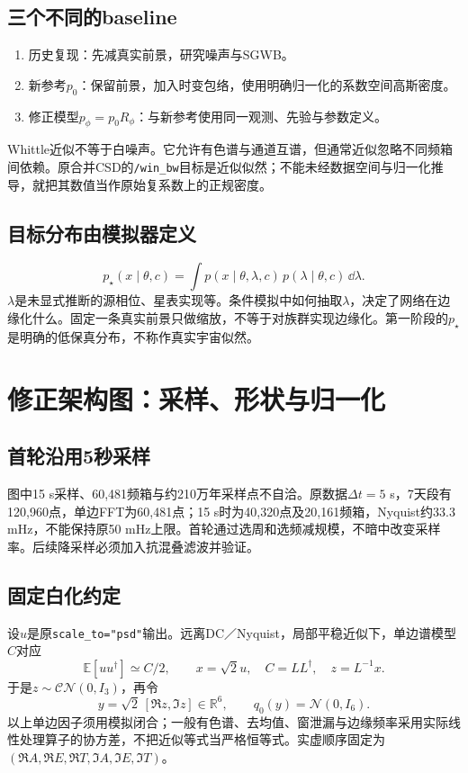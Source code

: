 \documentclass[UTF8,fontset=none,a4paper,11pt]{ctexart}
\newcommand{\code}[1]{\texttt{\nolinkurl{#1}}}
\begin{document}
\subsection{三个不同的baseline}
\begin{enumerate}
\item 历史复现：先减真实前景，研究噪声与SGWB。
\item 新参考$p_0$：保留前景，加入时变包络，使用明确归一化的系数空间高斯密度。
\item 修正模型$p_\phi=p_0R_\phi$：与新参考使用同一观测、先验与参数定义。
\end{enumerate}
Whittle近似不等于白噪声。它允许有色谱与通道互谱，但通常近似忽略不同频箱间依赖。原合并CSD的\code{/win_bw}目标是近似似然；不能未经数据空间与归一化推导，就把其数值当作原始复系数上的正规密度。
\subsection{目标分布由模拟器定义}
\[
p_\star(x\mid\theta,c)=\int p(x\mid\theta,\lambda,c)\,
 p(\lambda\mid\theta,c)\,\dd\lambda.
\]
$\lambda$是未显式推断的源相位、星表实现等。条件模拟中如何抽取$\lambda$，决定了网络在边缘化什么。固定一条真实前景只做缩放，不等于对族群实现边缘化。第一阶段的$p_\star$是明确的低保真分布，不称作真实宇宙似然。
\clearpage

\section{修正架构图：采样、形状与归一化}
\subsection{首轮沿用5秒采样}
图中15 s采样、60,481频箱与约210万年采样点不自洽。原数据$\Delta t=5$ s，7天段有120,960点，单边FFT为60,481点；15 s时为40,320点及20,161频箱，Nyquist约33.3 mHz，不能保持原50 mHz上限。首轮通过选周和选频减规模，不暗中改变采样率。后续降采样必须加入抗混叠滤波并验证。
\subsection{固定白化约定}
设$u$是原\code{scale_to="psd"}输出。远离DC／Nyquist，局部平稳近似下，单边谱模型$C$对应
\[
\mathbb E[uu^\dagger]\simeq C/2,\qquad x=\sqrt2u,\quad C=LL^\dagger,
\quad z=L^{-1}x.
\]
于是$z\sim\mathcal{CN}(0,I_3)$，再令
\[
y=\sqrt2\,[\Re z,\Im z]\in\mathbb R^6,\qquad q_0(y)=\mathcal N(0,I_6).
\]
以上单边因子须用模拟闭合；一般有色谱、去均值、窗泄漏与边缘频率采用实际线性处理算子的协方差，不把近似等式当严格恒等式。实虚顺序固定为$(\Re A,\Re E,\Re T,\Im A,\Im E,\Im T)$。
\end{document}
